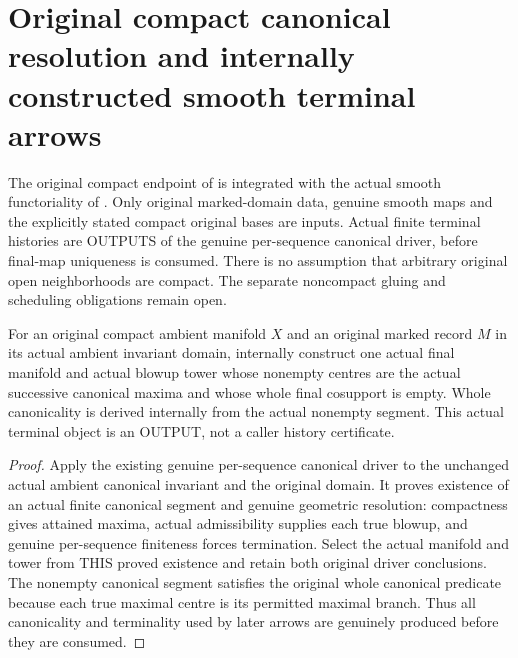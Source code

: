 \section{Original compact canonical resolution and internally constructed smooth terminal arrows}

The original compact endpoint of \cite{wlodarczyk05-hironaka} is integrated
with the actual smooth functoriality of
\cite{bierstone-milman08-functoriality}. Only original marked-domain data,
genuine smooth maps and the explicitly stated compact original bases are
inputs. Actual finite terminal histories are OUTPUTS of the genuine
per-sequence canonical driver, before final-map uniqueness is consumed.
There is no assumption that arbitrary original open neighborhoods are compact.
The separate noncompact gluing and scheduling obligations remain open.

\begin{definition}
\label{hir:smooth-original-compact-canonical-terminal-object}
\leanok
{}
For an original compact ambient manifold $X$ and an original marked record
$M$ in its actual ambient invariant domain, internally construct one actual
final manifold and actual blowup tower whose nonempty centres are the
actual successive canonical maxima and whose whole final cosupport is empty.
Whole canonicality is derived internally from the actual nonempty segment.
This actual terminal object is an OUTPUT, not a caller history certificate.
\end{definition}
\begin{proof}
Apply the existing genuine per-sequence canonical driver to the unchanged
actual ambient canonical invariant and the original domain. It proves
existence of an actual finite canonical segment and genuine geometric
resolution: compactness gives attained maxima, actual admissibility supplies
each true blowup, and genuine per-sequence finiteness forces termination.
Select the actual manifold and tower from THIS proved existence and retain
both original driver conclusions. The nonempty canonical segment satisfies
the original whole canonical predicate because each true maximal centre
is its permitted maximal branch. Thus all canonicality and terminality used
by later arrows are genuinely produced before they are consumed.
\end{proof}

